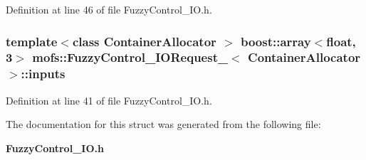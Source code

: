 Definition at line 46 of file Fuzzy\-Control\-\_\-\-I\-O.\-h.

\subsubsection[{inputs}]{\setlength{\rightskip}{0pt plus 5cm}template$<$class Container\-Allocator $>$ boost\-::array$<$float, 3$>$ {\bf mofs\-::\-Fuzzy\-Control\-\_\-\-I\-O\-Request\-\_\-}$<$ Container\-Allocator $>$\-::inputs}\label{structmofs_1_1FuzzyControl__IORequest___a54db9d16cff3472d84a91231c9a198ea}


Definition at line 41 of file Fuzzy\-Control\-\_\-\-I\-O.\-h.



The documentation for this struct was generated from the following file\-:\begin{DoxyCompactItemize}
\item 
{\bf Fuzzy\-Control\-\_\-\-I\-O.\-h}\end{DoxyCompactItemize}

